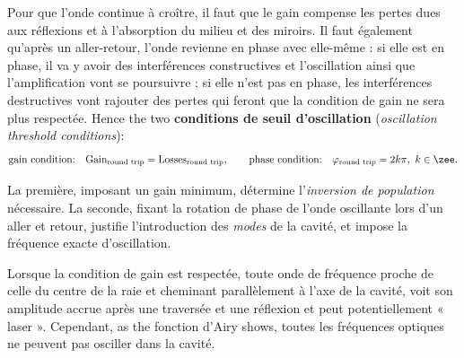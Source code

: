 \begin{prop}
  Pour que l'onde continue à croître, il faut que le gain compense les pertes
  dues aux réflexions et à l'absorption du milieu et des miroirs. Il faut
  également qu'après un aller-retour, l'onde revienne en phase avec elle-même :
  si elle est en phase, il va y avoir des interférences constructives et
  l'oscillation ainsi que l'amplification vont se poursuivre ; si elle n'est pas
  en phase, les interférences destructives vont rajouter des pertes qui feront
  que la condition de gain ne sera plus respectée. Hence the two
  \textbf{conditions de seuil d'oscillation} (\textit{oscillation threshold
  conditions}):
  \[\text{gain condition:}\quad
    \text{Gain}_{\text{round trip}}=\text{Losses}_{\text{round trip}},\qquad
    \text{phase condition:}\quad
    \varphi_{\text{round trip}}=2k\pi,\ k\in\zee.\]
\end{prop}

\begin{conclusion}
  La première, imposant un gain minimum, détermine l'\emph{inversion de
  population} nécessaire. La seconde, fixant la rotation de phase de l'onde
  oscillante lors d'un aller et retour, justifie l'introduction des \emph{modes}
  de la cavité, et impose la fréquence exacte d'oscillation.
\end{conclusion}

Lorsque la condition de gain est respectée, toute onde de fréquence proche de
celle du centre de la raie et cheminant parallèlement à l'axe de la cavité, voit
son amplitude accrue après une traversée et une réflexion et peut
potentiellement « laser ». Cependant, as the fonction d'Airy shows, toutes les
fréquences optiques ne peuvent pas osciller dans la cavité.

